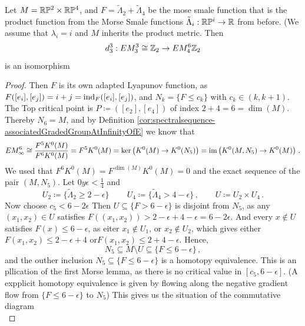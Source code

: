 	
	\begin{proposition}[$\R\PP^2\times \R\PP^4$]
		Let $M=\mathbb{R}\mathbb{P}^2\times \mathbb{R}\mathbb{P}^4$, and $F=\tilde{\Lambda}_2+\tilde{\Lambda}_4$ be the mose smale function that is the product function from the Morse Smale functions $\tilde{\Lambda}_i:\mathbb{R}\mathbb{P}^i\to \mathbb{R}$ from before. (We assume that $\lambda_i=i$ and $M$ inherits the product metric.
		Then 
		\begin{equation*}
			d^3_3:EM^3_3\cong \mathbb{Z}_2\to EM^6_4\mathbb{Z}_2
		\end{equation*} is an isomorphism
	\end{proposition}
	\begin{proof}
		 Then $F$ is its own adapted Lyapunov function, as $F([e_i],[e_j])=i+j=\mathrm{ind}_{F}([e_i],[e_j])$, and $N_k=\{F\leq c_k \}$ with $c_k\in(k,k+1)$. The Top critical point is $P\coloneq ([e_2],[e_4])$ of index $2+4=6=\dim(M)$. Thereby $N_6=M$, and by Definition \ref{cor:spectralsequence-associatedGradedGroupAtInfinityOfE} we know that 
		 \begin{equation*}
			EM^6_{\infty}\cong \frac{F^5K^0(M)}{F^6K^0(M)}=F^5K^0(M)=\ker\left(K^0(M)\to K^0(N_5)\right)=\mathrm{im}\left(K^0(M,N_5)\to K^0(M)\right)\,.
		 \end{equation*} We used that $F^6K^0(M)=F^{\dim(M)}K^0(M)=0$ and the exact sequence of the pair $(M,N_5)$. 
		 Let $0y\epsilon<\frac{1}{4}$ and 
		 \begin{equation*}
			U_2\coloneq \{\tilde{\Lambda}_2\geq 2-\epsilon\}\,\qquad U_4\coloneq \{\tilde{\Lambda}_4>4-\epsilon\}\,,\qquad U\coloneq U_2\times U_4\,.
		 \end{equation*} Now choose $c_5<6-2\epsilon$ Then $U\subseteq \{F>6-\epsilon\}$ is disjoint from $N_5$, as any $(x_1,x_2)\in U$ satisfies $F((x_1,x_2))>2-\epsilon+4-\epsilon=6-2\epsilon$. And every $x\notin U$ satisfies $F(x)\leq 6-\epsilon$, as eiter $x_1\notin U_1$, or $x_2\notin U_2$, which gives either $F(x_1,x_2)\leq 2-\epsilon+4$ or$F(x_1,x_2)\leq 2+4-\epsilon$. Hence,
		 \begin{equation*}
			N_5\subseteq M\setminus U \subseteq \{F\leq 6-\epsilon\}\,,
		 \end{equation*}and the outher inclusion $N_5\subseteq \{F\leq 6-\epsilon\}$ is a homotopy equivalence. This is an pllication of the first Morse lemma, as there is no critical value in $[c_5,6-\epsilon]$. (A expplicit homotopy equivalence is given by flowing along the negative gradient flow from  $\{F\leq 6-\epsilon\}$ to $N_5$)
		 This gives us the situation of the commutative diagram
		 \begin{equation}\label{eq:ExamplesThreeKernalsAgree}%

\end{equation}
\end{proof}
